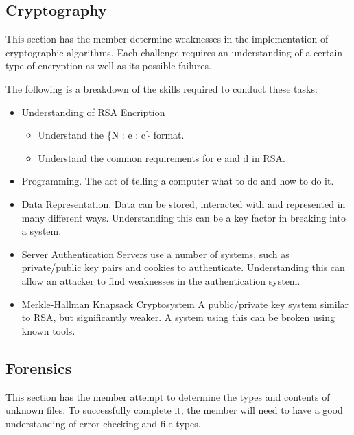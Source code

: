 \documentclass[a4paper,11pt]{report}
\begin{document}
		\subsection{Cryptography}
			This section has the member determine weaknesses in the implementation of cryptographic algorithms. 
			Each challenge requires an understanding of a certain type of encryption as well as its possible failures. 


			The following is a breakdown of the skills required to conduct these tasks:
			\begin{itemize}
				\item Understanding of RSA Encription
				\begin{itemize}
					\item Understand the \{N : e : c\} format. 
					\item Understand the common requirements for e and d in RSA. 
				\end{itemize}
				\item Programming. 
					The act of telling a computer what to do and how to do it. 
				\item Data Representation. 
					Data can be stored, interacted with and represented in many different ways. 
					Understanding this can be a key factor in breaking into a system. 
				\item Server Authentication
					Servers use a number of systems, such as private/public key pairs and cookies to authenticate. 
					Understanding this can allow an attacker to find weaknesses in the authentication system. 
				\item Merkle-Hallman Knapsack Cryptosystem
					A public/private key system similar to RSA, but significantly weaker. 
					A system using this can be broken using known tools. 
			\end{itemize}
		\subsection{Forensics}
			This section has the member attempt to determine the types and contents of unknown files. 
			To successfully complete it, the member will need to have a good understanding of error checking and file types. 
\end{document}
